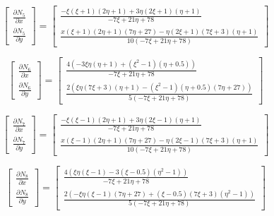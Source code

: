 \documentclass[a4paper, 12pt]{article}
\begin{document}
\begin{enumerate}
\begin{enumerate}
			\[
				\begin{bmatrix}
				\frac{\partial N_5}{\partial x} \\ 
				\frac{\partial N_5}{\partial y}
				\end{bmatrix}
				=
				\left[\begin{matrix}\frac{-\xi \left(\xi + 1\right) \left(2\eta + 1\right) + 3\eta \left(2\xi + 1\right) \left(\eta + 1\right)}{- 7\xi + 21\eta + 78}\\\frac{x \left(\xi + 1\right) \left(2\eta + 1\right) \left(7\eta + 27\right) -\eta \left(2\xi + 1\right) \left(7\xi + 3\right) \left(\eta + 1\right)}{10 \left(- 7\xi + 21\eta + 78\right)}\end{matrix}\right]
			\]

			\[
				\begin{bmatrix}
				\frac{\partial N_6}{\partial x} \\ 
				\frac{\partial N_6}{\partial y}
				\end{bmatrix}
				=
				\left[\begin{matrix}\frac{4 \left(- 3\xi\eta \left(\eta + 1\right) + \left(\xi^{2} - 1\right) \left(\eta + 0.5\right)\right)}{- 7\xi + 21\eta + 78}\\\frac{2 \left(\xi\eta \left(7\xi + 3\right) \left(\eta + 1\right) - \left(\xi^{2} - 1\right) \left(\eta + 0.5\right) \left(7\eta + 27\right)\right)}{5 \left(- 7\xi + 21\eta + 78\right)}\end{matrix}\right]
			\]

			\[
				\begin{bmatrix}
				\frac{\partial N_7}{\partial x} \\ 
				\frac{\partial N_7}{\partial y}
				\end{bmatrix}
				=
				\left[\begin{matrix}\frac{-\xi \left(\xi - 1\right) \left(2\eta + 1\right) + 3\eta \left(2\xi - 1\right) \left(\eta + 1\right)}{- 7\xi + 21\eta + 78}\\\frac{x \left(\xi - 1\right) \left(2\eta + 1\right) \left(7\eta + 27\right) -\eta \left(2\xi - 1\right) \left(7\xi + 3\right) \left(\eta + 1\right)}{10 \left(- 7\xi + 21\eta + 78\right)}\end{matrix}\right]
			\]

			\[
				\begin{bmatrix}
				\frac{\partial N_8}{\partial x} \\ 
				\frac{\partial N_8}{\partial y}
				\end{bmatrix}
				=
				\left[\begin{matrix}\frac{4 \left(\xi\eta \left(\xi - 1\right) - 3 \left(\xi - 0.5\right) \left(\eta^{2} - 1\right)\right)}{- 7\xi + 21\eta + 78}\\\frac{2 \left(-\xi\eta \left(\xi - 1\right) \left(7\eta + 27\right) + \left(\xi - 0.5\right) \left(7\xi + 3\right) \left(\eta^{2} - 1\right)\right)}{5 \left(- 7\xi + 21\eta + 78\right)}\end{matrix}\right]
			\]


\end{enumerate}
\end{enumerate}
\end{document}
